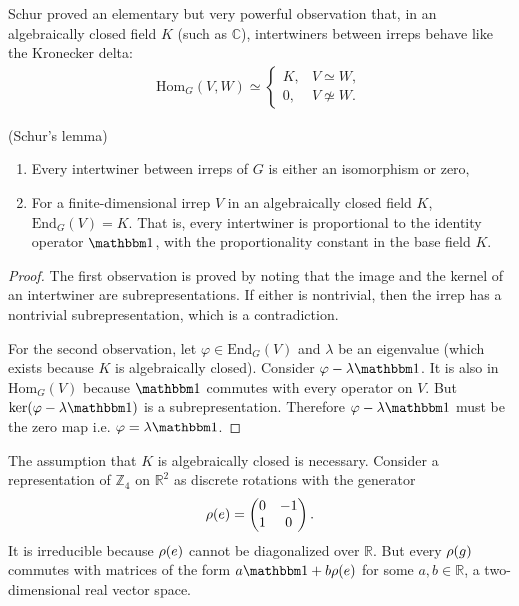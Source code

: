 Schur proved an elementary but very powerful observation that, in an algebraically closed field $K$ (such as $\mathbb{C}$), intertwiners between irreps behave like the Kronecker delta:
\begin{align}
\text{Hom}_G (V,W) \simeq
	\begin{cases}
		K, & V \simeq W, \\
		0, & V \not\simeq W.
	\end{cases}
\end{align}
\begin{lemma}\label{lemma:schur}
	{\normalfont (Schur's lemma)}
	\begin{enumerate}
		\item Every intertwiner between irreps of $G$ is either an isomorphism or zero,
		\item For a finite-dimensional irrep $V$ in an algebraically closed field $K$,  $\text{End}_G (V) = K$. That is, every intertwiner is proportional to the identity operator $\id$, with the proportionality constant in the base field $K$.
	\end{enumerate}
\end{lemma}
\begin{proof}
	The first observation is proved by noting that the image and the kernel of an intertwiner are subrepresentations. If either is nontrivial, then the irrep has a nontrivial subrepresentation, which is a contradiction.
	
	For the second observation, let $\varphi \in \text{End}_G (V)$ and $\lambda$ be an eigenvalue (which exists because $K$ is algebraically closed). Consider $\varphi - \lambda \id$. It is also in $\text{Hom}_G (V)$ because $\id$ commutes with every operator on $V$. But $\ker (\varphi - \lambda \id)$ is a subrepresentation. Therefore  $\varphi - \lambda \id$ must be the zero map i.e. $\varphi = \lambda \id$.
\end{proof}
\noindent
The assumption that $K$ is algebraically closed is necessary. Consider a representation of $\mathbb{Z}_4$ on $\mathbb{R}^2$ as discrete rotations with the generator
\begin{align}
\rho(e) = \begin{pmatrix}
0 & -1 \\
1 & 0
\end{pmatrix}.
\end{align}
It is irreducible because $\rho(e)$ cannot be diagonalized over $\mathbb{R}$. But every $\rho(g)$ commutes with matrices of the form $a\id + b\rep(e)$ for some $a,b \in \mathbb{R}$, a two-dimensional real vector space.

